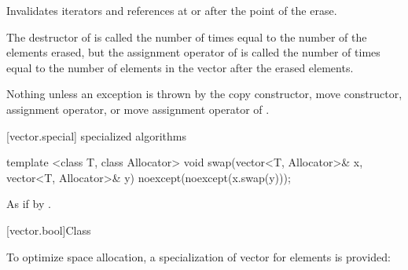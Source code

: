 \begin{itemdescr}
\pnum
\effects
Invalidates iterators and references at or after the point of the erase.

\pnum
\complexity
The destructor of  is called the number of times equal to the
number of the elements erased, but the assignment operator
of  is called the number of times equal to the number of
elements in the vector after the erased elements.

\pnum
\throws
Nothing unless an exception is thrown by the
copy constructor, move constructor,
assignment operator, or move assignment operator of
.
\end{itemdescr}

[vector.special]{ specialized algorithms}

%
%
\begin{itemdecl}
template <class T, class Allocator>
  void swap(vector<T, Allocator>& x, vector<T, Allocator>& y)
    noexcept(noexcept(x.swap(y)));
\end{itemdecl}

\begin{itemdescr}
\pnum
\effects
As if by .
\end{itemdescr}

[vector.bool]{Class }

\pnum
{}%
To optimize space allocation, a specialization of vector for
elements is provided:

